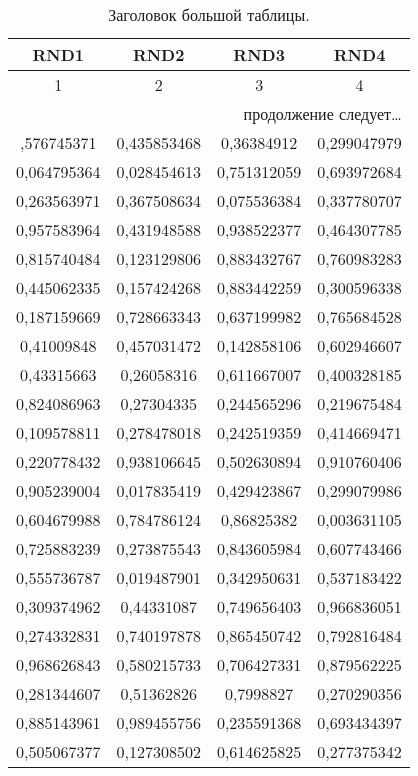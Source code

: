 \documentclass[a4paper,12pt]{article}%
\theoremstyle{plain}%
\theoremstyle{definition}%
\theoremstyle{remark}%
\begin{document}
\begin{longtable}{|c|c|c|c|}
\caption{Заголовок большой таблицы.}\\
\hline RND1 & RND2 & RND3 & RND4 \\
\hline \endfirsthead%
\hline 1 & 2 & 3 & 4 \\
\hline \endhead%
\hline
\multicolumn{4}{r}{продолжение следует\ldots} \\
\endfoot%
\hline
\endlastfoot%
0,576745371 & 0,435853468 & 0,36384912 & 0,299047979 \\
0,064795364 & 0,028454613 & 0,751312059 & 0,693972684 \\
0,263563971 & 0,367508634 & 0,075536384 & 0,337780707 \\
0,957583964 & 0,431948588 & 0,938522377 & 0,464307785 \\
0,815740484 & 0,123129806 & 0,883432767 & 0,760983283 \\
0,445062335 & 0,157424268 & 0,883442259 & 0,300596338 \\
0,187159669 & 0,728663343 & 0,637199982 & 0,765684528 \\
0,41009848 & 0,457031472 & 0,142858106 & 0,602946607 \\
0,43315663 & 0,26058316 & 0,611667007 & 0,400328185 \\
0,824086963 & 0,27304335 & 0,244565296 & 0,219675484 \\
0,109578811 & 0,278478018 & 0,242519359 & 0,414669471 \\
0,220778432 & 0,938106645 & 0,502630894 & 0,910760406 \\
0,905239004 & 0,017835419 & 0,429423867 & 0,299079986 \\
0,604679988 & 0,784786124 & 0,86825382 & 0,003631105 \\
0,725883239 & 0,273875543 & 0,843605984 & 0,607743466 \\
0,555736787 & 0,019487901 & 0,342950631 & 0,537183422 \\
0,309374962 & 0,44331087 & 0,749656403 & 0,966836051 \\
0,274332831 & 0,740197878 & 0,865450742 & 0,792816484 \\
0,968626843 & 0,580215733 & 0,706427331 & 0,879562225 \\
0,281344607 & 0,51362826 & 0,7998827 & 0,270290356 \\
0,885143961 & 0,989455756 & 0,235591368 & 0,693434397 \\
0,505067377 & 0,127308502 & 0,614625825 & 0,277375342 \\

\end{longtable}
\end{document}
